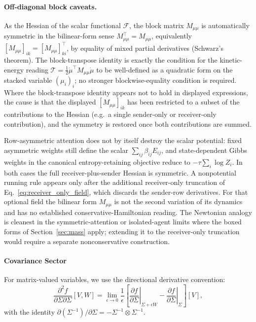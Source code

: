 \documentclass[11pt]{article}
\begin{document}
\paragraph{Off-diagonal block caveats.}\label{sec:mass_block_caveats}
As the Hessian of the scalar functional $\mathcal{F}$, the block matrix $M_{\mu\mu}$ is automatically symmetric in the bilinear-form sense $M_{\mu\mu}^\top = M_{\mu\mu}$, equivalently $[M_{\mu\mu}]_{ik} = [M_{\mu\mu}]_{ki}^\top$, by equality of mixed partial derivatives (Schwarz's theorem). The block-transpose identity is exactly the condition for the kinetic-energy reading $\mathcal{T} = \tfrac12 \dot\mu^\top M_{\mu\mu} \dot\mu$ to be well-defined as a quadratic form on the stacked variable $(\mu_i)_i$; no stronger blockwise-equality condition is required. Where the block-transpose identity appears not to hold in displayed expressions, the cause is that the displayed $[M_{\mu\mu}]_{ik}$ has been restricted to a subset of the contributions to the Hessian (e.g.\ a single sender-only or receiver-only contribution), and the symmetry is restored once both contributions are summed.

Row-asymmetric attention does not by itself destroy the scalar potential: fixed asymmetric weights still define the scalar $\sum_{ij}\beta_{ij}E_{ij}$, and state-dependent Gibbs weights in the canonical entropy-retaining objective reduce to $-\tau\sum_i\log Z_i$. In both cases the full receiver-plus-sender Hessian is symmetric. A nonpotential running rule appears only after the additional receiver-only truncation of Eq.~\eqref{eq:receiver_only_field}, which discards the sender-row derivatives. For that optional field the bilinear form $M_{\mu\mu}$ is not the second variation of its dynamics and has no established conservative-Hamiltonian reading. The Newtonian analogy is cleanest in the symmetric-attention or isolated-agent limits where the boxed forms of Section~\ref{sec:mass} apply; extending it to the receiver-only truncation would require a separate nonconservative construction.

\paragraph{Covariance Sector}

For matrix-valued variables, we use the directional derivative convention:
\begin{equation}
\frac{\partial^2 f}{\partial \Sigma \partial \Sigma}[V, W] = \lim_{\epsilon \to 0} \frac{1}{\epsilon}\left[\left.\frac{\partial f}{\partial \Sigma}\right|_{\Sigma + \epsilon W} - \left.\frac{\partial f}{\partial \Sigma}\right|_{\Sigma}\right][V],
\end{equation}
with the identity $\partial(\Sigma^{-1})/\partial \Sigma = -\Sigma^{-1} \otimes \Sigma^{-1}$.
\end{document}

